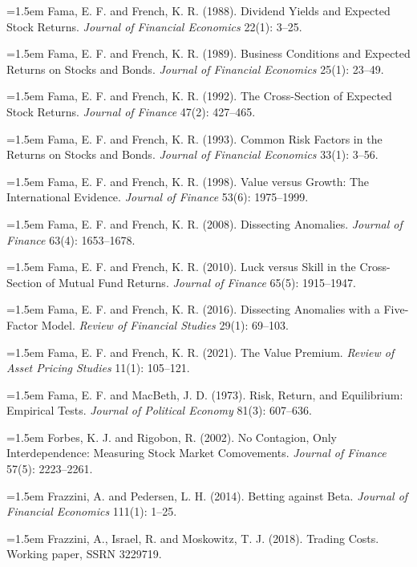 \hangindent=1.5em Fama, E. F. and French, K. R. (1988). Dividend Yields and Expected Stock Returns. \emph{Journal of Financial Economics} 22(1): 3--25.

\hangindent=1.5em Fama, E. F. and French, K. R. (1989). Business Conditions and Expected Returns on Stocks and Bonds. \emph{Journal of Financial Economics} 25(1): 23--49.

\hangindent=1.5em Fama, E. F. and French, K. R. (1992). The Cross-Section of Expected Stock Returns. \emph{Journal of Finance} 47(2): 427--465.

\hangindent=1.5em Fama, E. F. and French, K. R. (1993). Common Risk Factors in the Returns on Stocks and Bonds. \emph{Journal of Financial Economics} 33(1): 3--56.

\hangindent=1.5em Fama, E. F. and French, K. R. (1998). Value versus Growth: The International Evidence. \emph{Journal of Finance} 53(6): 1975--1999.

\hangindent=1.5em Fama, E. F. and French, K. R. (2008). Dissecting Anomalies. \emph{Journal of Finance} 63(4): 1653--1678.

\hangindent=1.5em Fama, E. F. and French, K. R. (2010). Luck versus Skill in the Cross-Section of Mutual Fund Returns. \emph{Journal of Finance} 65(5): 1915--1947.

\hangindent=1.5em Fama, E. F. and French, K. R. (2016). Dissecting Anomalies with a Five-Factor Model. \emph{Review of Financial Studies} 29(1): 69--103.

\hangindent=1.5em Fama, E. F. and French, K. R. (2021). The Value Premium. \emph{Review of Asset Pricing Studies} 11(1): 105--121.

\hangindent=1.5em Fama, E. F. and MacBeth, J. D. (1973). Risk, Return, and Equilibrium: Empirical Tests. \emph{Journal of Political Economy} 81(3): 607--636.

\hangindent=1.5em Forbes, K. J. and Rigobon, R. (2002). No Contagion, Only Interdependence: Measuring Stock Market Comovements. \emph{Journal of Finance} 57(5): 2223--2261.

\hangindent=1.5em Frazzini, A. and Pedersen, L. H. (2014). Betting against Beta. \emph{Journal of Financial Economics} 111(1): 1--25.

\hangindent=1.5em Frazzini, A., Israel, R. and Moskowitz, T. J. (2018). Trading Costs. Working paper, SSRN 3229719.

